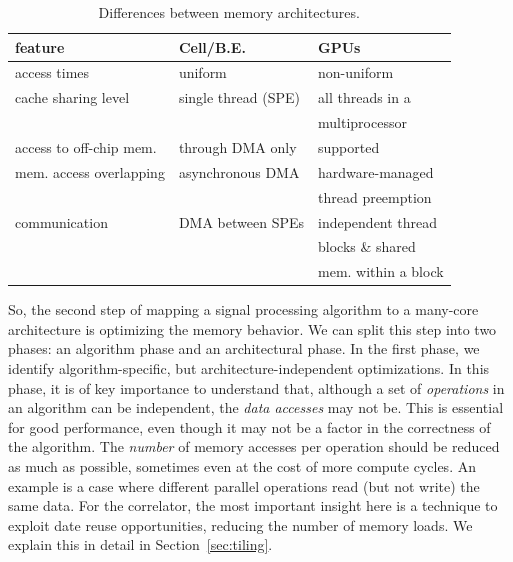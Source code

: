 \documentclass{article}
\begin{document}
\begin{table}[t]
\begin{center}
{\footnotesize
\begin{tabular}{|l|l|l|}
\hline
feature                   & Cell/B.E.                      & GPUs \\
\hline
access times              & uniform                        & non-uniform \\
\hline
cache sharing level       & single thread (SPE)            & all threads in a \\
                          &                                & multiprocessor \\
\hline
access to off-chip mem.   & through DMA only               & supported \\
\hline
mem. access overlapping   & asynchronous DMA               & hardware-managed \\
                          &                                & thread preemption \\
\hline
communication             & DMA between SPEs               & independent thread  \\
                          &                                & blocks \& shared   \\
                          &                                & mem. within a block \\
\hline
\end{tabular}
} %
\end{center}
\vspace{-0.5cm}
\caption{Differences between memory architectures.}
\label{memory-properties}
\end{table}

So, the second step of mapping a signal processing algorithm to a many-core architecture
is optimizing the memory behavior. We can split this step into two phases:
an algorithm phase and an architectural phase.
In the first phase, we identify algorithm-specific, but
architecture-independent optimizations. 
In this phase, it is of key importance to understand that, although a
set of \emph{operations} in an algorithm can be independent, the \emph{data
  accesses} may not be.  This is essential for good performance, even though it may not be a
factor in the correctness of the algorithm. The \emph{number} of memory accesses per operation should
be reduced as much as possible, sometimes even at the cost of more
compute cycles. An example is a case
where different parallel operations read (but not write) the
same data.  For the correlator, the most important insight here
is a technique to exploit date reuse opportunities, reducing the number of memory
loads. We explain this in detail in Section~\ref{sec:tiling}.
\end{document}
